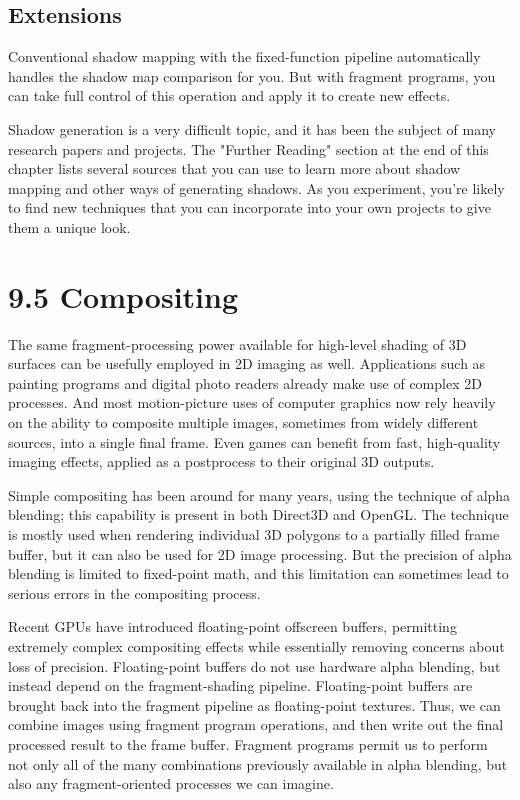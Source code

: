 \documentclass[../main.tex]{subfiles}
\begin{document}
\subsection*{Extensions}

Conventional shadow mapping with the fixed-function pipeline automatically handles the shadow map comparison for you. But with fragment programs, you can take full control of this operation and apply it to create new effects.

Shadow generation is a very difficult topic, and it has been the subject of many research papers and projects. The "Further Reading" section at the end of this chapter lists several sources that you can use to learn more about shadow mapping and other ways of generating shadows. As you experiment, you're likely to find new techniques that you can incorporate into your own projects to give them a unique look.

\section{9.5 Compositing}

The same fragment-processing power available for high-level shading of 3D surfaces can be usefully employed in 2D imaging as well. Applications such as painting programs and digital photo readers already make use of complex 2D processes. And most motion-picture uses of computer graphics now rely heavily on the ability to composite multiple images, sometimes from widely different sources, into a single final frame. Even games can benefit from fast, high-quality imaging effects, applied as a postprocess to their original 3D outputs.

Simple compositing has been around for many years, using the technique of alpha blending; this capability is present in both Direct3D and OpenGL. The technique is mostly used when rendering individual 3D polygons to a partially filled frame buffer, but it can also be used for 2D image processing. But the precision of alpha blending is limited to fixed-point math, and this limitation can sometimes lead to serious errors in the compositing process.

Recent GPUs have introduced floating-point offscreen buffers, permitting extremely complex compositing effects while essentially removing concerns about loss of precision. Floating-point buffers do not use hardware alpha blending, but instead depend on the fragment-shading pipeline. Floating-point buffers are brought back into the fragment pipeline as floating-point textures. Thus, we can combine images using fragment program operations, and then write out the final processed result to the frame buffer. Fragment programs permit us to perform not only all of the many combinations previously available in alpha blending, but also any fragment-oriented processes we can imagine.
\end{document}
